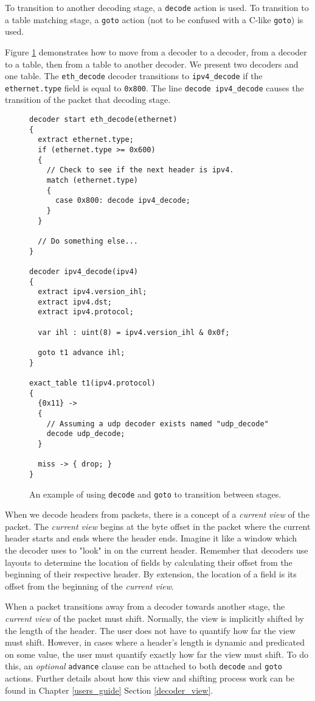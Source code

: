 To transition to another decoding stage, a \texttt{decode} action is used. To transition to a table matching stage, a \texttt{goto} action (not to be confused with a C-like \texttt{goto}) is used. 

Figure \ref{fg:transition_ex} demonstrates how to move from a decoder to a decoder, from a decoder to a table, then from a table to another decoder. We present two decoders and one table. The \texttt{eth\_decode} decoder transitions to \texttt{ipv4\_decode} if the \texttt{ethernet.type} field is equal to \texttt{0x800}. The line \texttt{decode ipv4\_decode} causes the transition of the packet that decoding stage.

\begin{figure}
\begin{lstlisting}
decoder start eth_decode(ethernet)
{
  extract ethernet.type;
  if (ethernet.type >= 0x600) 
  {
  	// Check to see if the next header is ipv4.
    match (ethernet.type)
    {
      case 0x800: decode ipv4_decode;
    }
  }
  
  // Do something else...
}

decoder ipv4_decode(ipv4)
{
  extract ipv4.version_ihl;
  extract ipv4.dst;
  extract ipv4.protocol;
  
  var ihl : uint(8) = ipv4.version_ihl & 0x0f;
  
  goto t1 advance ihl;
}

exact_table t1(ipv4.protocol)
{
  {0x11} ->
  {
    // Assuming a udp decoder exists named "udp_decode"
    decode udp_decode;
  }
  
  miss -> { drop; }
}
\end{lstlisting}
\caption{An example of using \texttt{decode} and \texttt{goto} to transition between stages.}
\label{fg:transition_ex}
\end{figure}

When we decode headers from packets, there is a concept of a \textit{current view} of the packet. The \textit{current view} begins at the byte offset in the packet where the current header starts and ends where the header ends. Imagine it like a window which the decoder uses to "look" in on the current header. Remember that decoders use layouts to determine the location of fields by calculating their offset from the beginning of their respective header. By extension, the location of a field is its offset from the beginning of the \textit{current view}. 

When a packet transitions away from a decoder towards another stage, the \textit{current view} of the packet must shift. Normally, the view is implicitly shifted by the length of the header. The user does not have to quantify how far the view must shift. However, in cases where a header's length is dynamic and predicated on some value, the user must quantify exactly how far the view must shift. To do this, an \textit{optional} \texttt{advance} clause can be attached to both \texttt{decode} and \texttt{goto} actions. Further details about how this view and shifting process work can be found in Chapter \ref{users_guide} Section \ref{decoder_view}.

